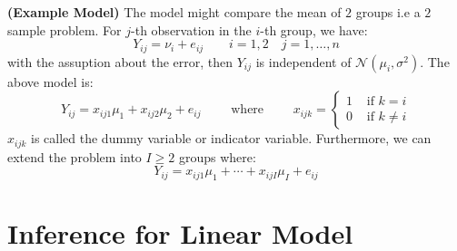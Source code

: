 \begin{remark}{\textbf{(Example Model)}}
    The model might compare the mean of $2$ groups i.e a $2$ sample problem. For $j$-th observation in the $i$-th group, we have:
    \begin{equation*}
        Y_{ij} = \nu_i + e_{ij} \qquad i = 1,2 \quad j=1,\dots,n
    \end{equation*}
    with the assuption about the error, then $Y_{ij}$ is independent of $\mathcal{N}(\mu_i, \sigma^2)$. The above model is:
    \begin{equation*}
        Y_{ij} = x_{ij1} \mu_1 + x_{ij2}\mu_2 + e_{ij} \qquad \text{ where } \qquad x_{ijk} = \begin{cases}
            1 & \text{ if } k = i \\
            0 & \text{ if } k \ne i
        \end{cases}
    \end{equation*}
    $x_{ijk}$ is called the dummy variable or indicator variable. Furthermore, we can extend the problem into $I\ge2$ groups where:
    \begin{equation*}
        Y_{ij} = x_{ij1}\mu_1 + \cdots + x_{ijI}\mu_I + e_{ij}
    \end{equation*}
\end{remark}

\section{Inference for Linear Model}

